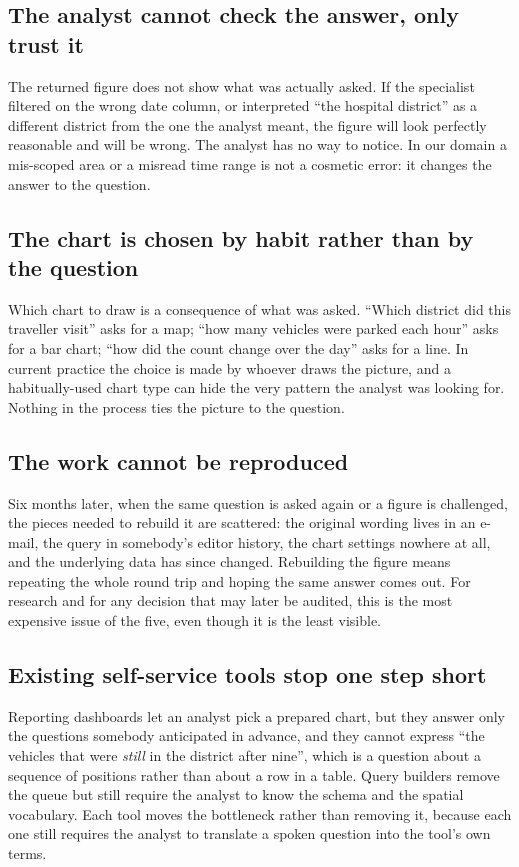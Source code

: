 \documentclass[12pt,a4paper]{report}
\begin{document}
\subsection{The analyst cannot check the answer, only trust it}

The returned figure does not show what was actually asked. If the specialist
filtered on the wrong date column, or interpreted ``the hospital district'' as a
different district from the one the analyst meant, the figure will look
perfectly reasonable and will be wrong. The analyst has no way to notice. In our
domain a mis-scoped area or a misread time range is not a cosmetic error: it
changes the answer to the question.

\subsection{The chart is chosen by habit rather than by the question}

Which chart to draw is a consequence of what was asked. ``Which district did
this traveller visit'' asks for a map; ``how many vehicles were parked each
hour'' asks for a bar chart; ``how did the count change over the day'' asks for
a line. In current practice the choice is made by whoever draws the picture, and
a habitually-used chart type can hide the very pattern the analyst was looking
for. Nothing in the process ties the picture to the question.

\subsection{The work cannot be reproduced}

Six months later, when the same question is asked again or a figure is
challenged, the pieces needed to rebuild it are scattered: the original wording
lives in an e-mail, the query in somebody's editor history, the chart settings
nowhere at all, and the underlying data has since changed. Rebuilding the figure
means repeating the whole round trip and hoping the same answer comes out. For
research and for any decision that may later be audited, this is the most
expensive issue of the five, even though it is the least visible.

\subsection{Existing self-service tools stop one step short}

Reporting dashboards let an analyst pick a prepared chart, but they answer only
the questions somebody anticipated in advance, and they cannot express ``the
vehicles that were \emph{still} in the district after nine'', which is a
question about a sequence of positions rather than about a row in a table. Query
builders remove the queue but still require the analyst to know the schema and
the spatial vocabulary. Each tool moves the bottleneck rather than removing it,
because each one still requires the analyst to translate a spoken question into
the tool's own terms.
\end{document}
